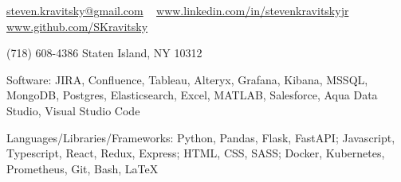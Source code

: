 \documentclass[10pt,letterpaper]{article}
\begin{document}
\sloppy  %

\nobreakvspace{0.3em}

\noindent
\href{mailto:steven.kravitsky@gmail.com}{steven.kravitsky\mbox{}@\mbox{}gmail.com} \ \faEnvelopeO
\sbull
\href{https://www.linkedin.com/in/stevenkravitskyjr}{www.linkedin.com/in/stevenkravitskyjr} \ \faLinkedinSquare
\sbull
\href{https://github.com/SKravitsky}{www.github.com/SKravitsky} \ \faGithub

\noindent
(718) 608-4386
\sbull
Staten Island, NY 10312

\spacedhrule{0.9em}{-0.4em}  %


\inlineheadsection  %
  {Software:}
  {JIRA, Confluence, Tableau, Alteryx, Grafana, Kibana, MSSQL, MongoDB, Postgres, Elasticsearch, Excel, MATLAB, Salesforce, Aqua Data Studio, Visual Studio Code}

\vspace{0.1em}
\inlineheadsection
  {Languages/Libraries/Frameworks:}
  {Python, Pandas, Flask, FastAPI; Javascript, Typescript, React, Redux, Express; HTML, CSS, SASS; Docker, Kubernetes, Prometheus, Git, Bash, LaTeX}

\spacedhrule{1.8em}{-0.4em}

\end{document}
